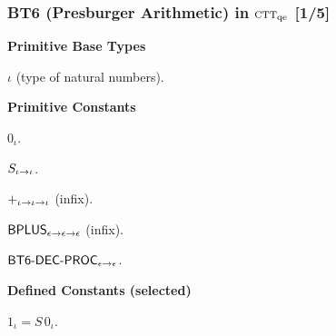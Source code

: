 \documentclass[t,12pt,numbers,fleqn]{beamer}
\newcommand{\churchqe}{$\mbox{\sc ctt}_{\rm qe}$}
\begin{document}
\begin{frame}
\frametitle{BT6 (Presburger Arithmetic) in {\churchqe} [1/5]}
\small
\bi

  \item[] \textbf{Primitive Base Types}

  \be

    \item $\iota$ (type of natural numbers).

  \ee

  \item[] \textbf{Primitive Constants}

  \be

    \item $0_\iota$.

    \item $S_{\iota \rightarrow \iota}$.

    \item $+_{\iota \rightarrow \iota \rightarrow \iota}$ (infix).

    \item $\mbox{\sf BPLUS}_{\epsilon \rightarrow \epsilon \rightarrow \epsilon}$ (infix).

    \setcounter{enumi}{5}

    \item $\mbox{\sf BT6-DEC-PROC}_{\epsilon \rightarrow \epsilon}$.

  \ee

  \item[] \textbf{Defined Constants (selected)}

  \be

    \item $1_\iota = S \, 0_\iota$.

  \ee

\ei

\end{frame}

\end{document}
